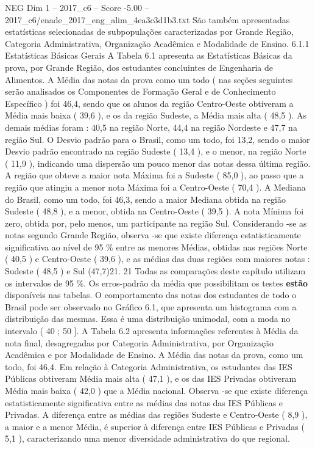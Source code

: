 \begin{textsample}{NEG Dim 1 – 2017\_c6 – Score -5.00 – 2017\_c6/enade\_2017\_eng\_alim\_4ea3c3d1b3.txt}
São também apresentadas estatísticas selecionadas de subpopulações caracterizadas por Grande Região, Categoria Administrativa, Organização Acadêmica e Modalidade de Ensino. 6.1.1 Estatísticas Básicas Gerais A Tabela 6.1 apresenta as Estatísticas Básicas da prova, por Grande Região, dos estudantes concluintes de Engenharia de Alimentos.
A Média das notas da prova como um todo ( nas seções seguintes serão analisados os Componentes de Formação Geral e de Conhecimento Específico ) foi 46,4, sendo que os alunos da região Centro-Oeste obtiveram a Média mais baixa ( 39,6 ), e os da região Sudeste, a Média mais alta ( 48,5 ).
As demais médias foram : 40,5 na região Norte, 44,4 na região Nordeste e 47,7 na região Sul.
O Desvio padrão para o Brasil, como um todo, foi 13,2, sendo o maior Desvio padrão encontrado na região Sudeste ( 13,4 ), e o menor, na região Norte ( 11,9 ), indicando uma dispersão um pouco menor das notas dessa última região.
A região que obteve a maior nota Máxima foi a Sudeste ( 85,0 ), ao passo que a região que atingiu a menor nota Máxima foi a Centro-Oeste ( 70,4 ).
A Mediana do Brasil, como um todo, foi 46,3, sendo a maior Mediana obtida na região Sudeste ( 48,8 ), e a menor, obtida na Centro-Oeste ( 39,5 ).
A nota Mínima foi zero, obtida por, pelo menos, um participante na região Sul.
Considerando -se as notas segundo Grande Região, observa -se que existe diferença estatisticamente significativa ao nível de 95 \% entre as menores Médias, obtidas nas regiões Norte ( 40,5 ) e Centro-Oeste ( 39,6 ), e as médias das duas regiões com maiores notas : Sudeste ( 48,5 ) e Sul (47,7)21. 21 Todas as comparações deste capítulo utilizam os intervalos de 95 \%.
Os erros-padrão da média que possibilitam os testes \textbf{estão} disponíveis nas tabelas.
O comportamento das notas dos estudantes de todo o Brasil pode ser observado no Gráfico 6.1, que apresenta um histograma com a distribuição das mesmas.
Essa é uma distribuição unimodal, com a moda no intervalo ( 40 ; 50 ].
A Tabela 6.2 apresenta informações referentes à Média da nota final, desagregadas por Categoria Administrativa, por Organização Acadêmica e por Modalidade de Ensino.
A Média das notas da prova, como um todo, foi 46,4.
Em relação à Categoria Administrativa, os estudantes das IES Públicas obtiveram Média mais alta ( 47,1 ), e os das IES Privadas obtiveram Média mais baixa ( 42,0 ) que a Média nacional.
Observa -se que existe diferença estatisticamente significativa entre as médias das notas das IES Públicas e Privadas.
A diferença entre as médias das regiões Sudeste e Centro-Oeste ( 8,9 ), a maior e a menor Média, é superior à diferença entre IES Públicas e Privadas ( 5,1 ), caracterizando uma menor diversidade administrativa do que regional.

\end{textsample}
